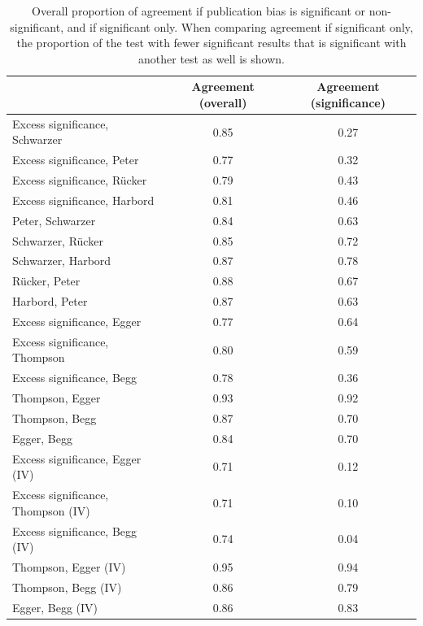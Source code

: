 \documentclass[11pt,a4paper,twoside]{book}\usepackage[]{graphicx}\usepackage[]{color}
\begin{document}
\begin{table}[ht]
\centering
\begingroup\scriptsize
\begin{tabular}{lcc}
  \hline
 & Agreement (overall) & Agreement (significance) \\ 
  \hline
Excess significance, Schwarzer & 0.85 & 0.27 \\ 
  Excess significance, Peter & 0.77 & 0.32 \\ 
  Excess significance, R\"ucker & 0.79 & 0.43 \\ 
  Excess significance, Harbord & 0.81 & 0.46 \\ 
  Peter, Schwarzer & 0.84 & 0.63 \\ 
  Schwarzer, R\"ucker & 0.85 & 0.72 \\ 
  Schwarzer, Harbord & 0.87 & 0.78 \\ 
  R\"ucker, Peter & 0.88 & 0.67 \\ 
  Harbord, Peter & 0.87 & 0.63 \\ 
  Excess significance, Egger & 0.77 & 0.64 \\ 
  Excess significance, Thompson & 0.80 & 0.59 \\ 
  Excess significance, Begg & 0.78 & 0.36 \\ 
  Thompson, Egger & 0.93 & 0.92 \\ 
  Thompson, Begg & 0.87 & 0.70 \\ 
  Egger, Begg & 0.84 & 0.70 \\ 
  Excess significance, Egger (IV) & 0.71 & 0.12 \\ 
  Excess significance, Thompson (IV) & 0.71 & 0.10 \\ 
  Excess significance, Begg (IV) & 0.74 & 0.04 \\ 
  Thompson, Egger (IV) & 0.95 & 0.94 \\ 
  Thompson, Begg (IV) & 0.86 & 0.79 \\ 
  Egger, Begg (IV) & 0.86 & 0.83 \\ 
   \hline
\end{tabular}
\endgroup
\caption{Overall proportion of agreement if publication bias is significant or non-significant, and if significant only. When comparing agreement if significant only, the proportion of the test with fewer significant results that is significant with another test as well is shown.} 
\label{test.agreement}
\end{table}
\end{document}
